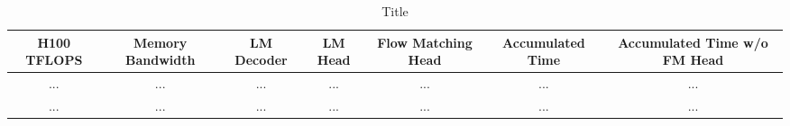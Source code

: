 \begin{table}[ht]
\centering
\caption{\small Title}
\begin{tabular}{ccccccc}
\toprule
\textbf{H100 TFLOPS} & \textbf{Memory Bandwidth} & \textbf{LM Decoder} & \textbf{LM Head} & \textbf{Flow Matching Head} & \textbf{Accumulated Time} &
\textbf{Accumulated Time w/o FM Head} \\
\midrule
... & ... & ... & ... & ... & ... & ... \\
... & ... & ... & ... & ... & ... & ... \\
\bottomrule
\end{tabular}
\label{tab:inference_time}
\end{table}